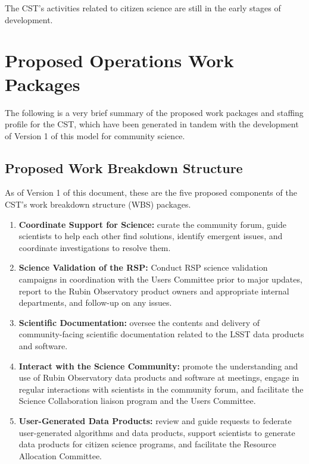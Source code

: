 \documentclass[DM,authoryear,toc]{lsstdoc}
\begin{document}
The CST's activities related to citizen science are still in the early stages of development.






\section{Proposed Operations Work Packages}\label{sec:comp}

The following is a very brief summary of the proposed work packages and staffing profile for the CST, which have been generated in tandem with the development of Version 1 of this model for community science.


\subsection{Proposed Work Breakdown Structure}\label{ssec:comp_wbs}

As of Version 1 of this document, these are the five proposed components of the CST's work breakdown structure (WBS) packages.

\begin{enumerate}
\item \textbf{Coordinate Support for Science:} curate the community forum, guide scientists to help each other find solutions, identify emergent issues, and coordinate investigations to resolve them.
\item \textbf{Science Validation of the RSP:} Conduct RSP science validation campaigns in coordination with the Users Committee prior to major updates, report to the Rubin Observatory product owners and appropriate internal departments, and follow-up on any issues.
\item \textbf{Scientific Documentation:} oversee the contents and delivery of community-facing scientific documentation related to the LSST data products and software. 
\item \textbf{Interact with the Science Community:} promote the understanding and use of Rubin Observatory data products and software at meetings, engage in regular interactions with scientists in the community forum, and facilitate the Science Collaboration liaison program and the Users Committee.
\item \textbf{User-Generated Data Products:} review and guide requests to federate user-generated algorithms and data products, support scientists to generate data products for citizen science programs, and facilitate the Resource Allocation Committee.
\end{enumerate}
\end{document}

